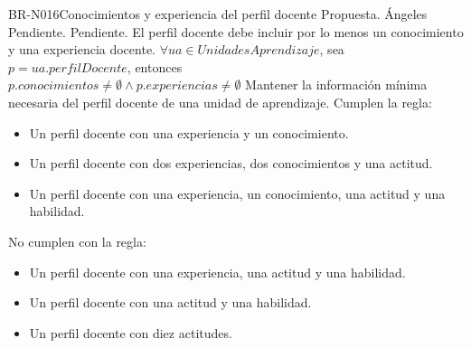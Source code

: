\begin{BusinessRule}{BR-N016}{Conocimientos y experiencia del perfil docente}
	{\bcIntegridad}    %
	{\btEnabler}     %
	{\blControlling}    %
	\BRItem[Estado] Propuesta.
	 Ángeles
	 Pendiente.
	 Pendiente.
	\BRItem[Descripción] El perfil docente debe incluir por lo menos un conocimiento y una experiencia docente.
	\BRItem[Sentencia]
		 $ \forall ua \in UnidadesAprendizaje$, sea $p = ua.perfilDocente$, entonces\\

		 $ p.conocimientos \neq \emptyset \land p.experiencias \neq \emptyset $
	\BRItem[Motivación] Mantener la información mínima necesaria del perfil docente de una unidad de aprendizaje.
	 Cumplen la regla:
		\begin{itemize}
			\item Un perfil docente con una experiencia y un conocimiento.
			\item Un perfil docente con dos experiencias, dos conocimientos y una actitud.
			\item Un perfil docente con una experiencia, un conocimiento, una actitud y una habilidad.
		\end{itemize}
	 No cumplen con la regla:
		\begin{itemize}
			\item Un perfil docente con una experiencia, una actitud y una habilidad.
			\item Un perfil docente con una actitud y una habilidad.
			\item Un perfil docente con diez actitudes.
		\end{itemize}
\end{BusinessRule}

